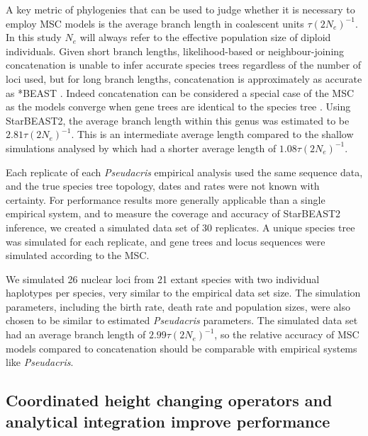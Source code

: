 \documentclass[12pt]{article}
\begin{document}
A key metric of phylogenies that can be used to judge whether it is necessary
to employ MSC models is the average branch length in coalescent units
$\tau(2N_e)^{-1}$. In this study $N_e$ will always refer to the
effective population size of diploid individuals. Given short branch lengths,
likelihood-based or neighbour-joining concatenation is unable to infer accurate
species trees regardless of the number of loci used, but for long branch
lengths, concatenation is approximately as accurate as *BEAST
\citep{Ogilvie01052016}. Indeed concatenation can be considered a special
case of the MSC as the models converge when gene
trees are identical to the species tree \citep{NYAS:NYAS12747}. Using StarBEAST2, the average branch length within
this genus was estimated to be $2.81\tau(2N_e)^{-1}$. This is an
intermediate average length compared to the shallow simulations analysed by
\cite{Ogilvie01052016} which had a shorter average length of
$1.08\tau(2N_e)^{-1}$.

Each replicate of each \textit{Pseudacris} empirical analysis used the same
sequence data, and the true species tree topology, dates and rates were not
known with certainty. For performance results more generally applicable than a
single empirical system, and to measure the coverage and accuracy of
StarBEAST2 inference, we created a simulated data set of 30 replicates. A
unique species tree was simulated for each replicate, and gene trees and locus
sequences were simulated according to the MSC.

We simulated 26 nuclear loci from 21 extant species with two individual
haplotypes per species, very similar to the empirical data set size. The
simulation parameters, including the birth rate, death rate and population
sizes, were also chosen to be similar to estimated \textit{Pseudacris}
parameters. The simulated data set had an average branch length of
$2.99\tau(2N_e)^{-1}$, so the relative accuracy of MSC models compared
to concatenation should be comparable with empirical systems like
\textit{Pseudacris}.

\subsection{Coordinated height changing operators and analytical integration improve performance}
\end{document}
